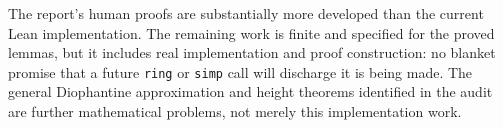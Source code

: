 The report's human proofs are substantially more developed than the
current Lean implementation. The remaining work is finite and specified
for the proved lemmas, but it includes real implementation and proof
construction: no blanket promise that a future \texttt{ring} or
\texttt{simp} call will discharge it is being made. The general
Diophantine approximation and height theorems identified in the audit
are further mathematical problems, not merely this implementation work.
